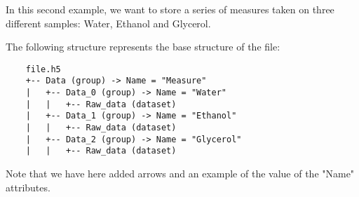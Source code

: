 In this second example, we want to store a series of measures taken on three different samples: Water, Ethanol and Glycerol.

The following structure represents the base structure of the file:
\begin{verbatim}
    file.h5
    +-- Data (group) -> Name = "Measure"
    |   +-- Data_0 (group) -> Name = "Water"
    |   |   +-- Raw_data (dataset)
    |   +-- Data_1 (group) -> Name = "Ethanol"
    |   |   +-- Raw_data (dataset)
    |   +-- Data_2 (group) -> Name = "Glycerol"
    |   |   +-- Raw_data (dataset)
\end{verbatim}
Note that we have here added arrows and an example of the value of the "Name" attributes.